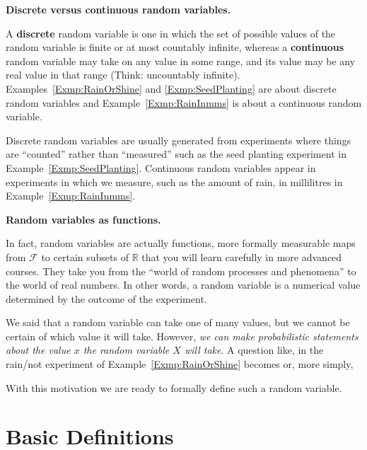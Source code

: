\bigskip

{\bf \large Discrete  versus continuous random variables.}


\medskip

A {\bf discrete}  random variable is one in which the set of possible values of the random variable 
is  finite or  at most  countably infinite,  whereas a {\bf continuous} random variable may take on 
any value in some range, and its value may be any real value in that range (Think: uncountably infinite).  
Examples~\ref{Exmp:RainOrShine} and \ref{Exmp:SeedPlanting} are about discrete random variables and 
Example~\ref{Exmp:RainInmms} is about a continuous random variable.

Discrete random variables are usually generated from experiments where
things are ``counted'' rather than ``measured''  such
as  the seed planting experiment in Example~\ref{Exmp:SeedPlanting}.  
Continuous random variables appear in
experiments in which we measure, such as the amount of rain, in 
millilitres in Example~\ref{Exmp:RainInmms}.


{\large \bf{Random variables as functions.}}


In fact, random variables are actually functions, more formally measurable maps from $\mathcal{F}$ to certain subsets of $\mathbb{R}$ that you will learn carefully in more advanced courses.  They take you from
the ``world of random processes and phenomena'' to the world of real
numbers.  In other words, a random variable is a numerical value
determined by the outcome of the experiment.

We said that a random variable can take one of many values, but we
cannot be certain of which value it will take.  However, {\em we can
  make probabilistic statements about the value $x$ the random variable
  $X$ will take}.   A question like,
 in the
rain/not experiment of Example~\ref{Exmp:RainOrShine} becomes  
or, more simply,

With this motivation we are ready to formally define such a random variable.

\section{Basic Definitions}\label{S:RVBasicDefs}

